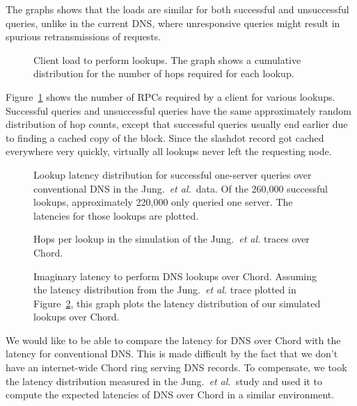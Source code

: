 The graphs shows that the loads are similar for both
successful and unsuccessful queries, unlike in the current
DNS, where unresponsive queries might result in spurious 
retransmissions of requests.

\begin{figure}
\caption{Client load to perform lookups. 
The graph shows a cumulative distribution for the number
of hops required for each lookup.}
\label{fig:hops}
\end{figure}

Figure~\ref{fig:hops} shows the number of RPCs required
by a client for various lookups.
Successful queries and unsuccessful queries have the same
approximately random distribution of hop counts, except
that successful queries usually end earlier due to finding
a cached copy of the block.
Since the slashdot record got cached everywhere very quickly,
virtually all lookups never left the requesting node.

\begin{figure}
\caption{Lookup latency distribution for successful one-server
queries over conventional DNS in the Jung.~{\em et al.}\ data.
Of the 260,000 successful lookups,
approximately 220,000 only queried one server.  The latencies for
those lookups are plotted.}
\label{fig:oklat}
\end{figure}

\begin{figure}
\caption{Hops per lookup in the simulation of the Jung.~{\em et al.} traces
over Chord.}
\label{fig:hopslat}
\end{figure}

\begin{figure}
\caption{Imaginary latency to perform DNS lookups over Chord.
Assuming the latency distribution from the Jung.~{\em et al.} trace plotted
in Figure~\ref{fig:oklat}, this graph plots the latency distribution
of our simulated lookups over Chord.}
\label{fig:imaglat}
\end{figure}

We would like to be able to compare the latency for DNS over Chord
with the latency for conventional DNS.  This is made difficult by the fact
that we don't have an internet-wide Chord ring serving DNS records.
To compensate, we took the latency distribution measured in the Jung.~{\em et al.}\ study
and used it to compute the expected latencies of DNS over Chord
in a similar environment.

